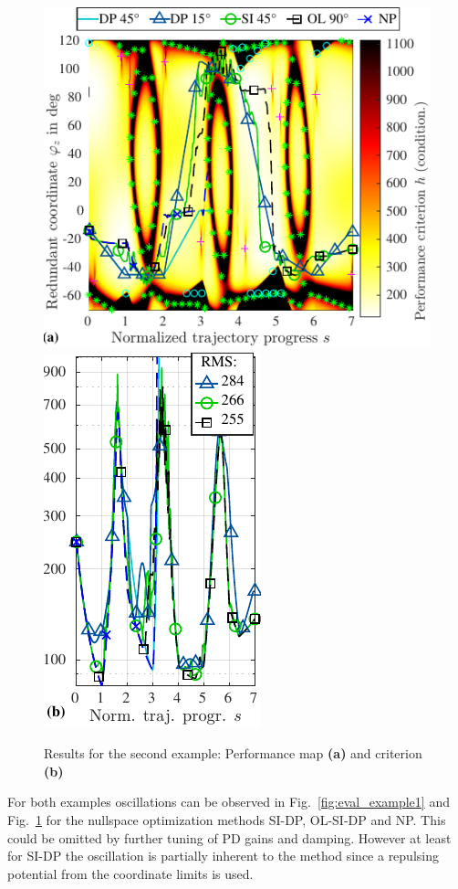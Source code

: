 \documentclass[runningheads]{llncs}
\begin{document}
\begin{figure}[htb]
\centering
\includegraphics{nullspace_traj2_compressed.pdf}
\includegraphics{nullspace_traj2_condition.pdf}
\vspace{-0.3cm}
\caption{Results for the second example: Performance map \textbf{(a)} and criterion \textbf{(b)}}
\label{fig:eval_example2}
\end{figure}

For both examples oscillations can be observed in Fig.~\ref{fig:eval_example1} and Fig.~\ref{fig:eval_example2} for the nullspace optimization methods SI-DP, OL-SI-DP and NP.
This could be omitted by further tuning of PD gains and damping.
However at least for SI-DP the oscillation is partially inherent to the method since a repulsing potential from the coordinate limits is used.
\end{document}
